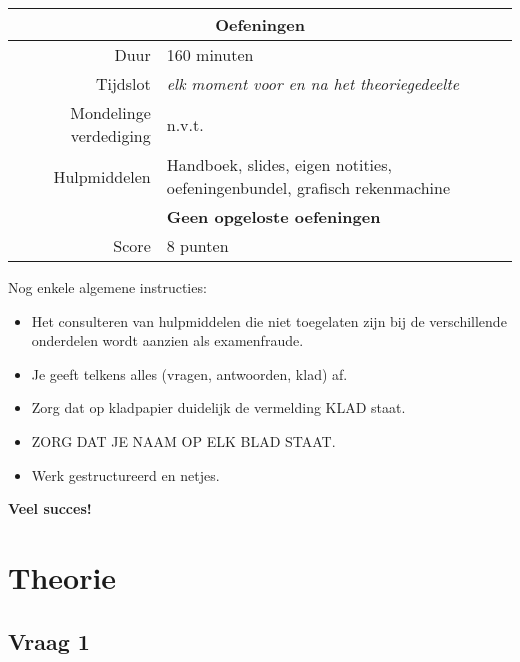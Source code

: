 \documentclass[kulak]{kulakarticle}
\begin{document}
\begin{table}[h!]
\begin{tabular}{r l}
			                             \multicolumn{2}{c}{\textbf{Oefeningen}}                               \\ \hline
			                  Duur & 160 minuten                                                               \\
			              Tijdslot & \textit{elk moment voor en na het theoriegedeelte}                        \\
			Mondelinge verdediging & n.v.t.                                                                    \\
			          Hulpmiddelen & Handboek, slides, eigen notities, oefeningenbundel, grafisch rekenmachine \\
			                       & \textbf{Geen opgeloste oefeningen}                                        \\
			                 Score & 8 punten \\ \hline
		\end{tabular}
	\end{table}

	Nog enkele algemene instructies:
	\begin{itemize}
		\item Het consulteren van hulpmiddelen die niet toegelaten zijn bij de verschillende onderdelen wordt aanzien als examenfraude.
		\item Je geeft telkens alles (vragen, antwoorden, klad) af.
		\item Zorg dat op kladpapier duidelijk de vermelding KLAD staat.
		\item ZORG DAT JE NAAM OP ELK BLAD STAAT.
		\item Werk gestructureerd en netjes.
	\end{itemize}

	\flushright

	\textbf{Veel succes!}

	\flushleft

	\newpage

	\section*{Theorie}

	\subsection*{Vraag 1}
\end{document}
